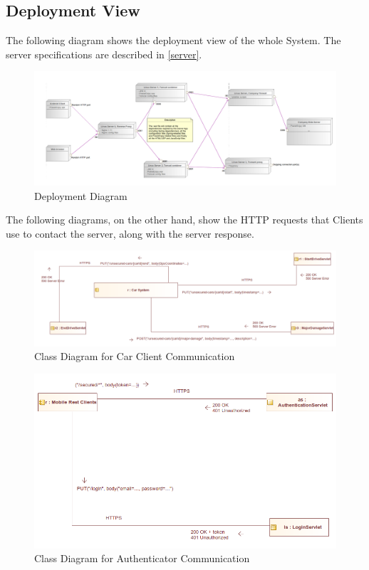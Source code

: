 \documentclass[12pt]{article}
\begin{document}
\subsection{Deployment View}
The following diagram shows the deployment view of the whole System. The server specifications are described in \ref{server}.
\begin{figure}[h]
	\centering
	\includegraphics[width=\textwidth]{../Images/Deployment}
	\caption{Deployment Diagram}
\end{figure}

The following diagrams, on the other hand, show the HTTP requests that Clients use to contact the server, along with the server response.

\begin{figure}[h]
	\centering
	\includegraphics[width=\textwidth]{../Images/CarClient_Communication}
	\caption{Class Diagram for Car Client Communication}
\end{figure}

\begin{figure}[h]
	\centering
	\includegraphics[width=\textwidth]{../Images/MobileAuth_Communication}
	\caption{Class Diagram for Authenticator Communication}
\end{figure}
\end{document}
